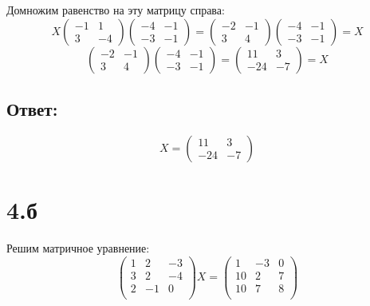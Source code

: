 \documentclass[a4paper]{article}
\begin{document}
Домножим равенство на эту матрицу справа:
\begin{equation*}
X\begin{pmatrix}
-1 & 1 \\
3 & -4
\end{pmatrix}
\begin{pmatrix}
-4 & -1 \\
-3 & -1
\end{pmatrix}
= 
\begin{pmatrix}
-2 & -1 \\
3 & 4
\end{pmatrix}
\begin{pmatrix}
-4 & -1 \\
-3 & -1
\end{pmatrix} = X
\end{equation*}
\begin{equation*}
\begin{pmatrix}
-2 & -1 \\
3 & 4
\end{pmatrix}
\begin{pmatrix}
-4 & -1 \\
-3 & -1
\end{pmatrix} =
\begin{pmatrix}
11 & 3 \\
-24 & -7
\end{pmatrix}
= X
\end{equation*}
\subsection{Ответ:}
\begin{equation*}
X = \begin{pmatrix}
11 & 3 \\
-24 & -7
\end{pmatrix}
\end{equation*}


\section*{4.б}

Решим матричное уравнение:
\begin{equation*}
\begin{pmatrix}
1 & 2 & -3 \\
3 & 2 & -4 \\
2 & -1 & 0 \\
\end{pmatrix}
X = \begin{pmatrix}
1 & -3 & 0 \\
10 & 2 & 7 \\
10 & 7 & 8 \\
\end{pmatrix}
\end{equation*}
\end{document}
